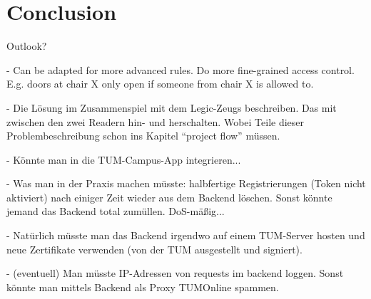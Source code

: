 \section{Conclusion}\label{sec:conclusion}


Outlook?

- Can be adapted for more advanced rules. Do more fine-grained access control. E.g. doors at chair X only open if someone from chair X is allowed to.

- Die Lösung im Zusammenspiel mit dem Legic-Zeugs beschreiben. Das mit zwischen den zwei Readern hin- und herschalten.
Wobei Teile dieser Problembeschreibung schon ins Kapitel ``project flow'' müssen.

- Könnte man in die TUM-Campus-App integrieren...

- Was man in der Praxis machen müsste: halbfertige Registrierungen (Token nicht aktiviert) nach einiger Zeit wieder aus dem Backend löschen. Sonst könnte jemand das Backend total zumüllen. DoS-mäßig...

- Natürlich müsste man das Backend irgendwo auf einem TUM-Server hosten und neue Zertifikate verwenden (von der TUM ausgestellt und signiert).

- (eventuell) Man müsste IP-Adressen von requests im backend loggen. Sonst könnte man mittels Backend als Proxy TUMOnline spammen.